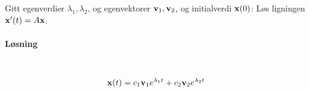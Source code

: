 Gitt egenverdier $\lambda_1,\lambda_2$,
og egenvektorer $\mathbf{v}_1, \mathbf{v}_2$,
og initialverdi $\mathbf{x}(0)$:
Løs ligningen $\mathbf{x}'(t) = A\mathbf{x}$.

\paragraph{Løsning} \hfill \\
$$\mathbf{x}(t) = c_1\mathbf{v}_1 e^{\lambda_1t} + c_2\mathbf{v}_2 e^{\lambda_2t}$$
